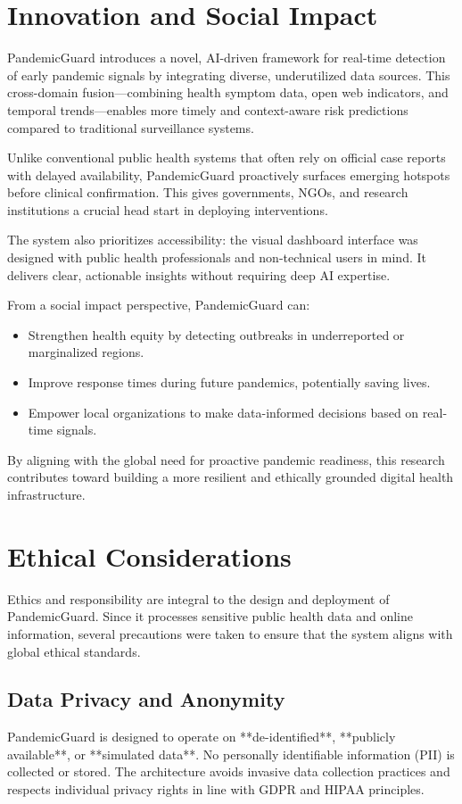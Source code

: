 \documentclass[11pt]{article}
\newcommand{\modelname}{PandemicGuard\xspace}
\begin{document}
\section{Innovation and Social Impact}

\modelname introduces a novel, AI-driven framework for real-time detection of early pandemic signals by integrating diverse, underutilized data sources. This cross-domain fusion—combining health symptom data, open web indicators, and temporal trends—enables more timely and context-aware risk predictions compared to traditional surveillance systems.

Unlike conventional public health systems that often rely on official case reports with delayed availability, \modelname proactively surfaces emerging hotspots before clinical confirmation. This gives governments, NGOs, and research institutions a crucial head start in deploying interventions.

The system also prioritizes accessibility: the visual dashboard interface was designed with public health professionals and non-technical users in mind. It delivers clear, actionable insights without requiring deep AI expertise.

From a social impact perspective, \modelname can:
\begin{itemize}
    \item Strengthen health equity by detecting outbreaks in underreported or marginalized regions.
    \item Improve response times during future pandemics, potentially saving lives.
    \item Empower local organizations to make data-informed decisions based on real-time signals.
\end{itemize}

By aligning with the global need for proactive pandemic readiness, this research contributes toward building a more resilient and ethically grounded digital health infrastructure.

\section{Ethical Considerations}

Ethics and responsibility are integral to the design and deployment of \modelname. Since it processes sensitive public health data and online information, several precautions were taken to ensure that the system aligns with global ethical standards.

\subsection{Data Privacy and Anonymity}
\modelname is designed to operate on **de-identified**, **publicly available**, or **simulated data**. No personally identifiable information (PII) is collected or stored. The architecture avoids invasive data collection practices and respects individual privacy rights in line with GDPR and HIPAA principles.
\end{document}
